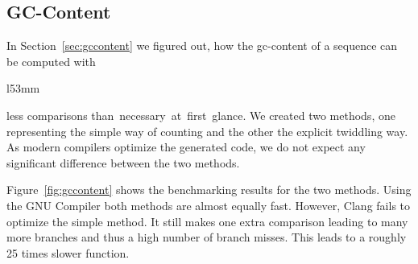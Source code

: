 \documentclass[10pt,letterpaper]{article}
\begin{document}
\subsection{GC-Content}
{
In Section~\ref{sec:gccontent} we figured out, how the gc-content of a sequence can be computed with


\begin{wrapfigure}[12]{l}{53mm}
    \captionsetup{labelformat=empty} %
    \caption{}
    \label{fig:gccontent}
\end{wrapfigure}

\noindent less comparisons than~necessary~at~first~glance. We created two methods, one representing the simple way of counting and the other the explicit twiddling way. As modern compilers optimize the generated code, we do not expect any significant difference between the two methods.

Figure~\ref{fig:gccontent} shows the benchmarking results for the two methods. 
Using the GNU Compiler both methods are almost equally fast. However, Clang fails to optimize the simple method. It still makes one extra comparison leading to many more branches and thus a high number of branch misses. This leads to a roughly 25 times slower function.

}
\end{document}
